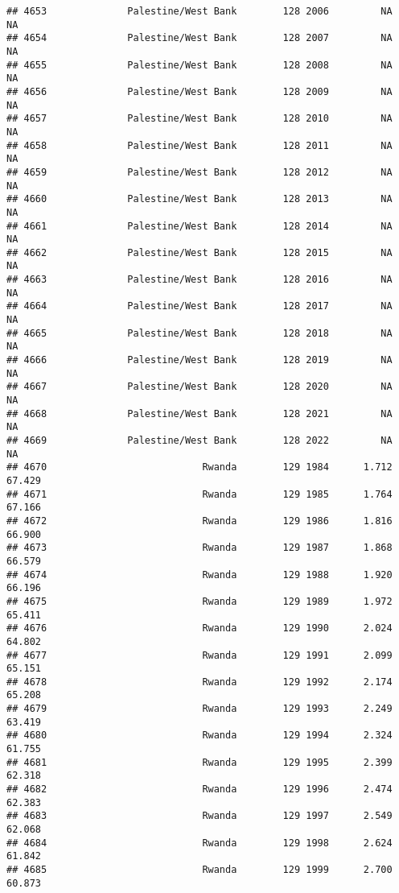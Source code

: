 \documentclass[
]{article}
\begin{document}
\begin{verbatim}
## 4653              Palestine/West Bank        128 2006         NA         NA
## 4654              Palestine/West Bank        128 2007         NA         NA
## 4655              Palestine/West Bank        128 2008         NA         NA
## 4656              Palestine/West Bank        128 2009         NA         NA
## 4657              Palestine/West Bank        128 2010         NA         NA
## 4658              Palestine/West Bank        128 2011         NA         NA
## 4659              Palestine/West Bank        128 2012         NA         NA
## 4660              Palestine/West Bank        128 2013         NA         NA
## 4661              Palestine/West Bank        128 2014         NA         NA
## 4662              Palestine/West Bank        128 2015         NA         NA
## 4663              Palestine/West Bank        128 2016         NA         NA
## 4664              Palestine/West Bank        128 2017         NA         NA
## 4665              Palestine/West Bank        128 2018         NA         NA
## 4666              Palestine/West Bank        128 2019         NA         NA
## 4667              Palestine/West Bank        128 2020         NA         NA
## 4668              Palestine/West Bank        128 2021         NA         NA
## 4669              Palestine/West Bank        128 2022         NA         NA
## 4670                           Rwanda        129 1984      1.712     67.429
## 4671                           Rwanda        129 1985      1.764     67.166
## 4672                           Rwanda        129 1986      1.816     66.900
## 4673                           Rwanda        129 1987      1.868     66.579
## 4674                           Rwanda        129 1988      1.920     66.196
## 4675                           Rwanda        129 1989      1.972     65.411
## 4676                           Rwanda        129 1990      2.024     64.802
## 4677                           Rwanda        129 1991      2.099     65.151
## 4678                           Rwanda        129 1992      2.174     65.208
## 4679                           Rwanda        129 1993      2.249     63.419
## 4680                           Rwanda        129 1994      2.324     61.755
## 4681                           Rwanda        129 1995      2.399     62.318
## 4682                           Rwanda        129 1996      2.474     62.383
## 4683                           Rwanda        129 1997      2.549     62.068
## 4684                           Rwanda        129 1998      2.624     61.842
## 4685                           Rwanda        129 1999      2.700     60.873

\end{verbatim}
\end{document}
